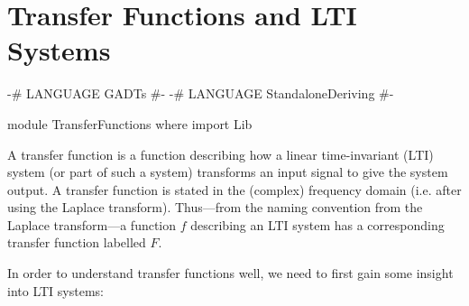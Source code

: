 \section{Transfer Functions and LTI Systems}\label{sec:tf}
\begin{code}
{-# LANGUAGE GADTs              #-}
{-# LANGUAGE StandaloneDeriving #-}

module TransferFunctions where
  import Lib
\end{code}
\LNContinue
\begin{modtext}
\noindent
A transfer function is a function describing how a linear time-invariant (LTI) system (or part of such a system) transforms an input signal to give the system output.\iffalse (more on LTI systems in a bit; \ref{sec:lti}). \fi 
A transfer function is stated in the (complex) frequency domain (i.e. after using the Laplace transform). Thus---from the naming convention from the Laplace transform---a function $f$ describing an LTI system has a corresponding transfer function labelled $F$.

In order to understand transfer functions well, we need to first gain some insight into LTI systems:
\end{modtext}

